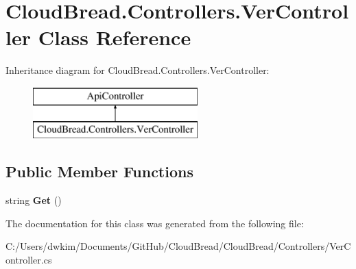 \hypertarget{a00191}{}\section{Cloud\+Bread.\+Controllers.\+Ver\+Controller Class Reference}
\label{a00191}
Inheritance diagram for Cloud\+Bread.\+Controllers.\+Ver\+Controller\+:\begin{figure}[H]
\begin{center}
\leavevmode
\includegraphics[height=2.000000cm]{a00191}
\end{center}
\end{figure}
\subsection*{Public Member Functions}
\begin{DoxyCompactItemize}
\item 
string {\bfseries Get} ()\hypertarget{a00191_ad82d16184a002fae5c1dcb873ebc7616}{}\label{a00191_ad82d16184a002fae5c1dcb873ebc7616}

\end{DoxyCompactItemize}


The documentation for this class was generated from the following file\+:\begin{DoxyCompactItemize}
\item 
C\+:/\+Users/dwkim/\+Documents/\+Git\+Hub/\+Cloud\+Bread/\+Cloud\+Bread/\+Controllers/Ver\+Controller.\+cs\end{DoxyCompactItemize}
